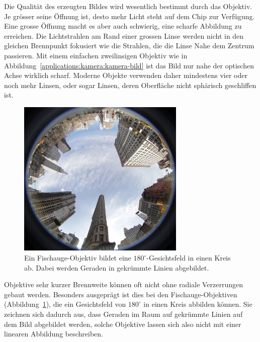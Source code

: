 Die Qualität des erzeugten Bildes wird wesentlich bestimmt durch das
Objektiv.
Je grösser seine Öffnung ist, desto mehr Licht steht auf dem Chip zur
Verfügung.
Eine grosse Öffnung macht es aber auch schwierig, eine scharfe Abbildung
zu erreichen.
Die Lichtstrahlen am Rand einer grossen Linse werden nicht in den gleichen
Brennpunkt fokusiert wie die Strahlen, die die Linse Nahe dem Zentrum
passieren.
Mit einem einfachen zweilinsigen Objektiv wie in
Abbildung~\ref{applications:kamera:kamera-bild} ist das Bild nur nahe
der optischen Achse wirklich scharf.
Moderne Objekte verwenden daher mindestens vier oder noch mehr Linsen,
oder sogar Linsen, deren Oberfläche nicht sphärisch geschliffen ist.

\begin{figure}
\centering
\includegraphics[width=8cm]{applications/kamera/fisheye.jpg}
\caption{Ein Fischauge-Objektiv bildet eine $180^\circ$-Gesichtsfeld in
einen Kreis ab.
Dabei werden Geraden in gekrümmte Linien abgebildet.
\label{applications:kamera:fisheye}}
\end{figure}%
Objektive sehr kurzer Brennweite können oft nicht ohne radiale Verzerrungen
gebaut werden.
Besonders ausgeprägt ist dies bei den Fischauge-Objektiven
(Abbildung~\ref{applications:kamera:fisheye}), die
ein Gesichtsfeld von $180^\circ$ in einen Kreis abbilden können.
Sie zeichnen sich dadurch aus, dass Geraden im Raum auf gekrümmte
Linien auf dem Bild abgebildet werden, solche Objektive lassen sich
also nicht mit einer linearen Abbildung beschreiben.

